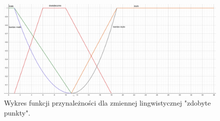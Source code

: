\documentclass{classrep}
\begin{document}
\begin{enumerate}
    \begin{figure}[H]
        \centering
        \includegraphics[width=14cm]{wykres_punkty.png}
        \caption{Wykres funkcji przynależności dla zmiennej lingwistycznej "zdobyte punkty".}
        \label{rysunek:punkty}
    \end{figure}
    

\end{enumerate}
\end{document}
